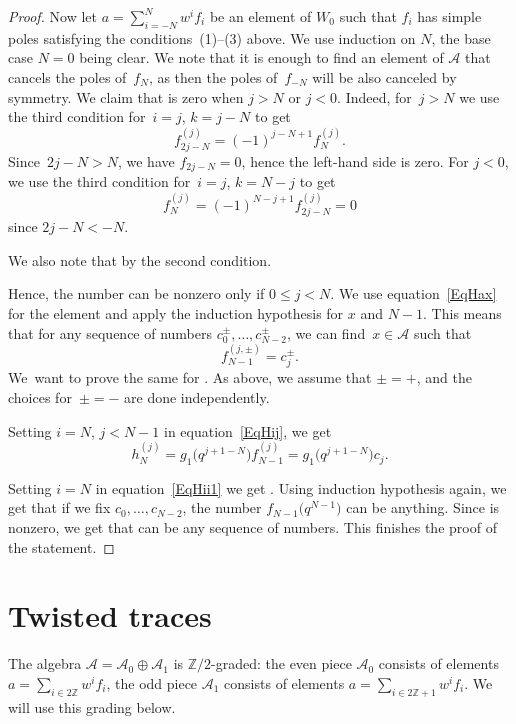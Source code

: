 \documentclass[pdftex]{sigma}
\newcommand\ZZ{\mathbb{Z}}
\newcommand{\mc}{\mathcal}
\numberwithin{equation}{section}
\theoremstyle{definition}
\begin{document}
\begin{proof}
Now let $a=\sum_{i=-N}^N w^i f_i$ be an element of $W_0$ such that $f_i$ has simple poles satisfying the conditions~(1)--(3) above. We use induction on $N$, the base case $N=0$ being clear. We note that it is enough to find an element of $\mc{A}$ that cancels the poles of~$f_N$, as then the poles of~$f_{-N}$ will be also canceled by symmetry. We claim that  is zero when $j>N$ or $j<0$. Indeed, for~${j>N}$ we use the third condition for~${i=j}$, $k=j-N$ to get
\[
f^{(j)}_{2j-N}=(-1)^{j-N+1}f^{(j)}_N.
\]
 Since~${2j-N>N}$, we have $f_{2j-N}=0$, hence the left-hand side is zero. For $j<0$, we use the third condition for~${i=j}$, $k=N-j$ to get
 \[
 f_N^{(j)}=(-1)^{N-j+1}f_{2j-N}^{(j)}=0
 \]
 since $2j-N<-N$.

We also note that  by the second condition.

Hence, the number  can be nonzero only if $0\leq j< N$. We use equation~\eqref{EqHax} for the element  and apply the induction hypothesis for $x$ and $N-1$. This means that for any sequence of numbers $c_0^{\pm},\ldots,c_{N-2}^{\pm}$, we can find~$x\in \mc{A}$ such that
\[
f_{N-1}^{(j,\pm)}=c_j^{\pm}.
\] We~want to prove the same for . As above, we assume that $\pm=+$, and the choices for~$\pm=-$ are done independently.

Setting $i=N$, $j<N-1$ in equation~\eqref{EqHij}, we get
\[h_N^{(j)}=g_1\bigl(q^{j+1-N}\bigr)f_{N-1}^{(j)}=g_1\bigl(q^{j+1-N}\bigr)c_j.\]

Setting $i=N$ in equation~\eqref{EqHii1} we get
. Using induction hypothesis again, we get that if we fix $c_0,\ldots,c_{N-2}$, the number $f_{N-1}\bigl(q^{N-1}\bigr)$ can be anything. Since  is nonzero, we get that  can be any sequence of numbers. This finishes the proof of the statement.
\end{proof}
\section{Twisted traces}
\label{SecTwistedTraces}
The algebra $\mc{A}=\mc{A}_0\oplus\mc{A}_1$ is $\ZZ/2$-graded: the even piece $\mc{A}_{0}$ consists of elements $a=\sum_{i\in 2\ZZ} w^i f_i$, the odd piece $\mc{A}_{1}$ consists of elements $a=\sum_{i\in 2\ZZ+1} w^i f_i$. We will use this grading below.
\end{document}
